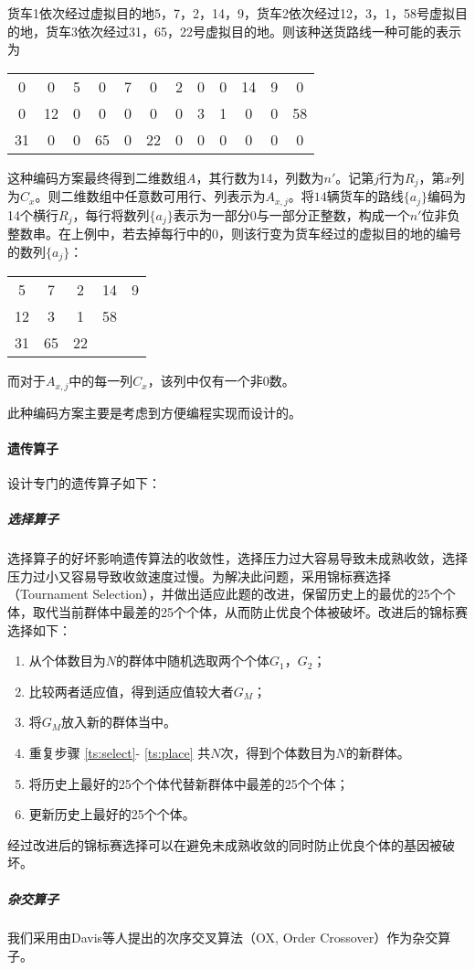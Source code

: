 \documentclass[UTF8,cs4size]{ctexart}
\begin{document}
货车1依次经过虚拟目的地5，7，2，14，9，货车2依次经过12，3，1，58号虚拟目的地，货车3依次经过31，65，22号虚拟目的地。则该种送货路线一种可能的表示为
\begin{center}
\begin{tabular}{cccccccccccc}
0 & 0 & 5 & 0 & 7 & 0 & 2 & 0 & 0 & 14 & 9 & 0 \\
0 & 12 & 0 & 0 & 0 & 0 & 0 & 3 & 1 & 0 & 0 & 58 \\
31 & 0 & 0 & 65 & 0 & 22 & 0 & 0 & 0 & 0 & 0 & 0 \\
\end{tabular}
\end{center}
这种编码方案最终得到二维数组$A$，其行数为14，列数为$n'$。记第$j$行为$R_j$，第$x$列为$C_x$。则二维数组中任意数可用行、列表示为$A_{x,j}$。将$14$辆货车的路线$\{a_j\}$编码为14个横行$R_j$，每行将数列$\{a_j\}$表示为一部分$0$与一部分正整数，构成一个$n'$位非负整数串。在上例中，若去掉每行中的$0$，则该行变为货车经过的虚拟目的地的编号的数列$\{a_j\}$：
\begin{center}
\begin{tabular}{ccccc}
5 & 7 & 2 & 14 & 9 \\
12 & 3 & 1 & 58 \\
31 & 65 & 22 \\
\end{tabular}
\end{center}
而对于$A_{x,j}$中的每一列$C_x$，该列中仅有一个非0数。

此种编码方案主要是考虑到方便编程实现而设计的。
\paragraph{遗传算子}
设计专门的遗传算子如下：
\subparagraph{选择算子}
选择算子的好坏影响遗传算法的收敛性，选择压力过大容易导致未成熟收敛，选择压力过小又容易导致收敛速度过慢。为解决此问题，采用锦标赛选择（Tournament  Selection），并做出适应此题的改进，保留历史上的最优的25个个体，取代当前群体中最差的25个个体，从而防止优良个体被破坏。改进后的锦标赛选择如下：
\begin{enumerate}
\item 从个体数目为$N$的群体中随机选取两个个体$G_1$，$G_2$；\label{ts:select}
\item 比较两者适应值，得到适应值较大者$G_M$；
\item 将$G_M$放入新的群体当中。\label{ts:place}
\item 重复步骤 \ref{ts:select}- \ref{ts:place} 共$N$次，得到个体数目为$N$的新群体。
\item 将历史上最好的25个个体代替新群体中最差的25个个体；
\item 更新历史上最好的25个个体。
\end{enumerate}
经过改进后的锦标赛选择可以在避免未成熟收敛的同时防止优良个体的基因被破坏。
\subparagraph{杂交算子}
我们采用由Davis等人提出的次序交叉算法（OX, Order Crossover）作为杂交算子。
\end{document}
